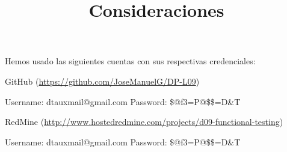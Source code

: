 \documentclass[a4paper]{article}
\title{Consideraciones}
\date{}
\begin{document}
\setlength{\voffset}{-1in}
\setlength{\textheight}{680px}
\setlength{\headsep}{30px}
\maketitle

Hemos usado las siguientes cuentas con sus respectivas credenciales:

GitHub (\url{https://github.com/JoseManuelG/DP-L09})

Username: dtauxmail@gmail.com
Password: \$@f3=P@\$\$=D\&T

RedMine (\url{http://www.hostedredmine.com/projects/d09-functional-testing})

Username: dtauxmail@gmail.com
Password: \$@f3=P@\$\$=D\&T
\end{document}

